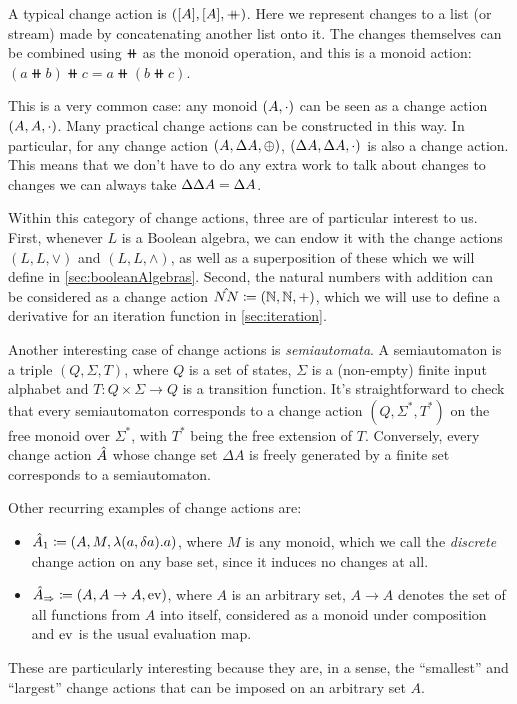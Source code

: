 A typical change action is $([A],[A],\mathbin{+\mkern-10mu+})$. Here we represent changes
to a list (or stream) made by concatenating another list onto it. The changes
themselves can be combined using $\doubleplus$ as the monoid operation, and this
is a monoid action: $(a \doubleplus b) \doubleplus c = a \doubleplus \left( b \doubleplus c \right)$.

This is a very common case: any monoid $(A, \cdot)$ can be seen as a change action
$(A,A,\cdot)$. Many practical change actions
can be constructed in this way. In particular, for any change action $(A,\Delta A,\oplus)$,
$(\Delta A,\Delta A,\cdot)$ is also a change action. This means
that we don't have to do any extra work to talk about changes to changes \textemdash{} we can 
always take $\Delta \Delta A = \Delta A$.

Within this category of change actions, three are of particular interest to us. First, whenever
$L$ is a Boolean algebra, we can endow it with the change actions $(L, L, \vee)$ and $(L, L, \wedge)$, 
as well as a superposition of these which we will define in \cref{sec:booleanAlgebras}. Second,
the natural numbers with addition can be considered as a change action 
$\hat{NN} \coloneqq (\mathbb{N}, \mathbb{N}, +)$, which we will
use to define a derivative for an iteration function in \cref{sec:iteration}.

Another interesting case of change actions is \textit{semiautomata}. A semiautomaton is a triple
$(Q, \Sigma, T)$, where $Q$ is a set of states, $\Sigma$ is a (non-empty) finite input alphabet
and $T : Q \times \Sigma \rightarrow Q$ is a transition function. It's straightforward to check
that every semiautomaton corresponds to a change action $(Q, \Sigma^*, T^*)$ on the free monoid
over $\Sigma^*$, with $T^*$ being the free extension of $T$. Conversely, every change action $\hat{A}$
whose change set $\Delta A$ is freely generated by a finite set corresponds to a semiautomaton.

Other recurring examples of change actions are:
\begin{itemize}
  \item $\hat{A}_1 \coloneqq (A,M,\lambda(a, \delta a). a)$, where $M$ is any monoid,
    which we call the \emph{discrete} change action on any base set, since it
    induces no changes at all.
  \item $\hat{A}_\Rightarrow \coloneqq (A,A \rightarrow A,\operatorname{ev})$, where $A$ is an arbitrary
    set, $A \rightarrow A$ denotes the set of all functions from $A$ into itself, considered as
    a monoid under composition and $\operatorname{ev}$ is the usual evaluation map.
\end{itemize}
These are particularly interesting because they are, in a sense, the ``smallest'' and ``largest''
change actions that can be imposed on an arbitrary set $A$.

